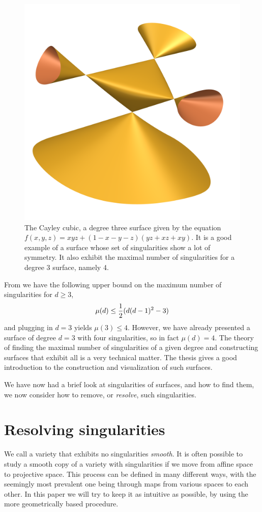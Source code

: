 \documentclass{article}
\begin{document}
\begin{example}
        \begin{figure}[h!]
            \centering
            \includegraphics[width=0.3\linewidth]{pictures/cayley_cubic.png}
            \caption{The Cayley cubic, a degree three surface given by the
                equation $f(x, y, z) = xyz + (1 - x  - y - z)(yz + xz + xy)$.
                It is a good example of a surface whose set of singularities
                show a lot of symmetry. It also exhibit the maximal number of
                singularities for a degree $3$ surface, namely 4.}
            \label{fig:cayley}
        \end{figure}
    \end{example}     
    
    From \cite[p.~7]{Lab14} we have the following upper bound on the maximum
    number of singularities for $d \geq 3$,
    \begin{equation}
        \notag
        \mu(d) \leq \frac{1}{2}(d(d-1)^2 - 3)
    \end{equation}
    and plugging in $d = 3$ yields $\mu(3) \leq 4$. However, we have already
    presented a surface of degree $d = 3$ with four singularities, so in fact
    $\mu(d) = 4$. The theory of finding the maximal number of singularities of
    a given degree and constructing surfaces that exhibit all is a very
    technical matter. The thesis \cite{oliver2005hypersurfaces} gives a good
    introduction to the construction and visualization of such surfaces.

    We have now had a brief look at singularities of surfaces, and how to find
    them, we now consider how to remove, or \emph{resolve}, such singularities.
    
    \section{Resolving singularities}
    \label{sec:resolving_singularities}
    
    We call a variety that exhibits no singularities \emph{smooth}. It is often possible to study a smooth copy of a variety with
    singularities if we move from affine space to projective space. This
    process can be defined in many different ways, with the seemingly most
    prevalent one being through maps from various spaces to each other. In this
    paper we will try to keep it as intuitive as possible, by using the more
    geometrically based procedure.
\end{document}
